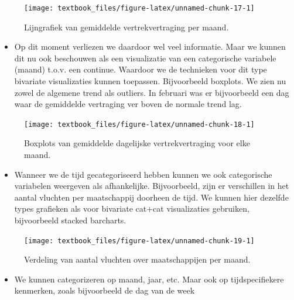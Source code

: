\documentclass[]{tufte-book}
\providecommand{\tightlist}{%
  \setlength{\itemsep}{0pt}\setlength{\parskip}{0pt}}
\begin{document}
\begin{figure}
\texttt{[image: textbook\_files/figure-latex/unnamed-chunk-17-1]} \caption[Lijngrafiek van gemiddelde vertrekvertraging per maand]{Lijngrafiek van gemiddelde vertrekvertraging per maand.}\label{fig:unnamed-chunk-17}
\end{figure}

\begin{itemize}
\tightlist
\item
  Op dit moment verliezen we daardoor wel veel informatie. Maar we kunnen dit nu ook beschouwen als een visualizatie van een categorische variabele (maand) t.o.v. een continue. Waardoor we de technieken voor dit type bivariate visualizaties kunnen toepassen. Bijvoorbeeld boxplots. We zien nu zowel de algemene trend als outliers. In februari was er bijvoorbeeld een dag waar de gemiddelde vertraging ver boven de normale trend lag.
\end{itemize}

\begin{figure}
\texttt{[image: textbook\_files/figure-latex/unnamed-chunk-18-1]} \caption[Boxplots van gemiddelde dagelijske vertrekvertraging voor elke maand]{Boxplots van gemiddelde dagelijske vertrekvertraging voor elke maand.}\label{fig:unnamed-chunk-18}
\end{figure}

\begin{itemize}
\tightlist
\item
  Wanneer we de tijd gecategoriseerd hebben kunnen we ook categorische variabelen weergeven als afhankelijke. Bijvoorbeeld, zijn er verschillen in het aantal vluchten per maatschappij doorheen de tijd. We kunnen hier dezelfde types grafieken als voor bivariate cat+cat visualizaties gebruiken, bijvoorbeeld stacked barcharts.
\end{itemize}

\begin{figure}
\texttt{[image: textbook\_files/figure-latex/unnamed-chunk-19-1]} \caption[Verdeling van aantal vluchten over maatschappijen per maand]{Verdeling van aantal vluchten over maatschappijen per maand.}\label{fig:unnamed-chunk-19}
\end{figure}

\begin{itemize}
\tightlist
\item
  We kunnen categorizeren op maand, jaar, etc. Maar ook op tijdspecifiekere kenmerken, zoals bijvoorbeeld de dag van de week
\end{itemize}
\end{document}
